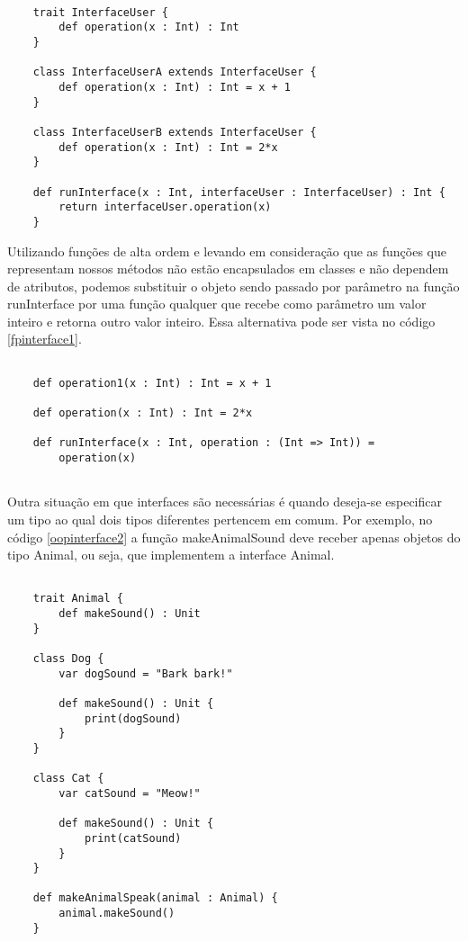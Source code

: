 \begin{lstlisting}[caption={Interfaces em Orientação a Objetos},label=oopinterface1]
    
    trait InterfaceUser {
        def operation(x : Int) : Int
    }

    class InterfaceUserA extends InterfaceUser {
        def operation(x : Int) : Int = x + 1
    }

    class InterfaceUserB extends InterfaceUser {
        def operation(x : Int) : Int = 2*x
    }

    def runInterface(x : Int, interfaceUser : InterfaceUser) : Int {
        return interfaceUser.operation(x)
    }

\end{lstlisting}

Utilizando funções de alta ordem e levando em 
consideração que as funções que representam nossos 
métodos não estão encapsulados em classes e 
não dependem de atributos, podemos substituir o 
objeto sendo passado por parâmetro na função 
runInterface por uma função qualquer que recebe 
como parâmetro um valor inteiro e retorna outro 
valor inteiro. Essa alternativa pode ser vista 
no código \ref{fpinterface1}.

\begin{lstlisting}[caption={Interfaces em Programação Funcional},label=fpinterface1]
    
    def operation1(x : Int) : Int = x + 1

    def operation(x : Int) : Int = 2*x

    def runInterface(x : Int, operation : (Int => Int)) =
        operation(x)
    
\end{lstlisting}



Outra situação em que interfaces são necessárias 
é quando deseja-se especificar um tipo ao qual 
dois tipos diferentes pertencem em comum. Por 
exemplo, no código \ref{oopinterface2} a função 
makeAnimalSound deve receber apenas objetos 
do tipo Animal, ou seja, que implementem 
a interface Animal.

\begin{lstlisting}[caption={Interfaces em Orientação a Objetos},label=oopinterface2]
    
    trait Animal {
        def makeSound() : Unit
    }

    class Dog {
        var dogSound = "Bark bark!"

        def makeSound() : Unit {
            print(dogSound)
        }
    }

    class Cat {
        var catSound = "Meow!"

        def makeSound() : Unit {
            print(catSound)
        }
    }

    def makeAnimalSpeak(animal : Animal) {
        animal.makeSound()
    }

\end{lstlisting}

